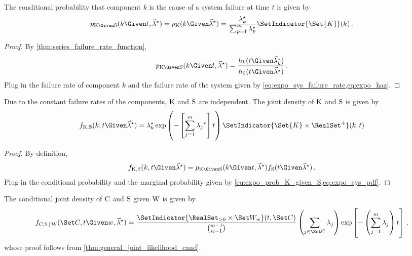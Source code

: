 \documentclass[../main.tex]{subfiles}
\begin{document}
The conditional probability that component $k$ is the cause of a system failure at time $t$ is given by
\begin{equation}
\label{eq:expo_prob_K_given_S}
    \pmf_{\RV{K} \Given \sv}(k \Given t, \tparam{\vec\lambda}) = \pmf_{\RV{K}}(k \Given \tparam{\vec\lambda}) =
        \frac{\tparam{\lambda}_k}{\sum_{p=1}^{m} 
        \tparam{\lambda}_p}\SetIndicator{\Set{K}}(k)\,.
\end{equation}
\begin{proof}
By \cref{thm:series_failure_rate_function},
\begin{equation}
\pmf_{\RV{K} \Given \sv}(k \Given t, \tparam{\vec\lambda}) = \frac
    {\haz_k(t \Given \tparam{\vec\lambda}_k)}
    {\haz_{\sv}(t \Given \tparam{\vec\lambda})}\,.
\end{equation}
Plug in the failure rate of component $k$ and the failure rate of the system given by \cref{eq:expo_sys_failure_rate,eq:expo_haz}.
\end{proof}
Due to the constant failure rates of the components, $\mathrm{K}$ and $\mathrm{S}$ are independent. The joint density of $\mathrm{K}$ and $\mathrm{S}$ is given by
\begin{equation}
\label{eq:expo_joint_k_s}
\pdf_{\RV{K}, \sv}(k, t \Given \tparam{\vec\lambda}) =
    \tparam{\lambda}_k \exp \left(-\left [ \sum_{j=1}^{m}{\tparam{\lambda_j}} \right ] t\right)
    \SetIndicator{\Set{K} \times \RealSet^{+}}(k,t)
\end{equation}
\begin{proof}
By definition,
\begin{equation}
\pdf_{\RV{K}, \sv}(k, t \Given \tparam{\vec\lambda}) =
    \pmf_{\RV{K} \Given \sv}(k \Given t, \tparam{\vec\lambda}) \spdf(t \Given \tparam{\vec\lambda})\,.
\end{equation}
Plug in the conditional probability and the marginal probability given by \cref{eq:expo_prob_K_given_S,eq:expo_sys_pdf}.
\end{proof}

The conditional joint density of $\mathrm{C}$ and $\mathrm{S}$ given $\mathrm{W}$ is given by
\begin{equation}
    \jointpdf(\cand, t \Given w, \tparam{\vec\lambda}) = \frac{\SetIndicator{\RealSet_{>0} \times \candsw{w}}(t,\cand)}{\binom{m-1}{w-1}} \left ( \sum_{j \in \cand} \lambda_j \right ) \exp \left [ - \left ( \sum_{j=1}^{m} \lambda_j \right ) t \right ]\,,
\end{equation}
whose proof follows from \cref{thm:general_joint_likelihood_cand}.
\end{document}
